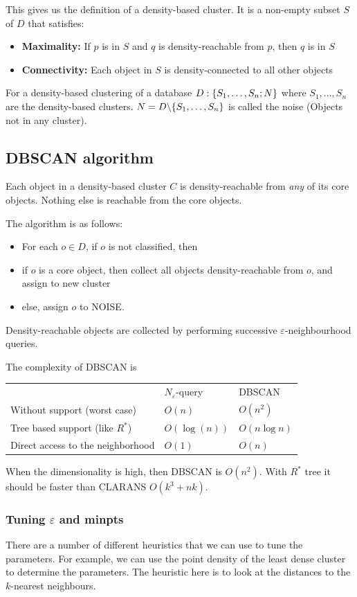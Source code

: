 This gives us the definition of a density-based cluster. It is a non-empty subset $S$ of $D$ that satisfies:
\begin{itemize}
    \item \textbf{Maximality:} If $p$ is in $S$ and $q$ is density-reachable from $p$, then $q$ is in $S$
    \item \textbf{Connectivity:} Each object in $S$ is density-connected to all other objects
\end{itemize}
For a density-based clustering of a database $D : \{S_1, \dots, S_n; N\}$ where $S_1, \dots, S_n$ are the density-based clusters. $N = D \backslash \{S_1, \dots, S_n\}$ is called the noise (Objects not in any cluster). 

\subsection{DBSCAN algorithm}
Each object in a density-based cluster $C$ is density-reachable from \emph{any} of its core objects. Nothing else is reachable from the core objects.

The algorithm is as follows:
\begin{itemize}
    \item For each $o \in D$, if $o$ is not classified, then
    \item if $o$ is a core object, then collect all objects density-reachable from $o$, and assign to new cluster
    \item else, assign $o$ to NOISE.
\end{itemize}
Density-reachable objects are collected by performing successive $\varepsilon$-neighbourhood queries. 

The complexity of DBSCAN is 
\begin{table}[h]
\begin{tabular}{lll}
 & $N_\varepsilon$-query & DBSCAN\\
 Without support (worst case) & $O(n)$  & $O(n^2)$ \\
 Tree based support (like $R^*$) & $O(\log(n))$ & $O(n\log{n})$\\
 Direct access to the neighborhood & $O(1)$ & $O(n)$
\end{tabular}
\end{table}

When the dimensionality is high, then DBSCAN is $O(n^2)$.  With $R^*$ tree it should be faster than CLARANS $O(k^3 + nk)$. 

\subsubsection{Tuning $\varepsilon$ and minpts}
    There are a number of different heuristics that we can use to tune the parameters. For example, we can use the point density of the least dense cluster to determine the parameters. The heuristic here is to look at the distances to the $k$-nearest neighbours.
    
